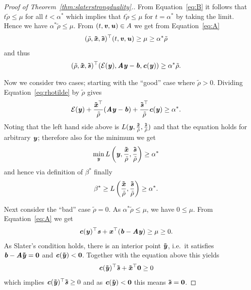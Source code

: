 {\begin{proof}[Proof of Theorem~\ref{thm:slaterstrongduality}.]
From Equation~\eqref{eq:B} it follows that $t\tilde\rho \leq \mu$ for all $t < \alpha^*$ which implies that $t\tilde\rho \leq \mu$ for $t = \alpha^*$ by taking the limit. Hence we have $\alpha^*\tilde\rho \leq \mu$.
From $(t, \vv, \uu) \in A$ we get from  Equation~\eqref{eq:A}
\begin{equation*}
(\tilde\rho, \xxtil, \sstil)^{\trp}(t, \vv, \uu) \geq \mu \geq \alpha^*\tilde\rho
\end{equation*}
and thus
\begin{equation}\label{eq:rhotilde}
(\tilde\rho, \xxtil, \sstil)^{\trp}(\energy(\yy), \AA\yy-\bb,\cc(\yy)) \geq \alpha^*\tilde\rho.
\end{equation}


Now we consider two cases; starting with the ``good'' case where $\tilde\rho > 0$.
Dividing  Equation~\eqref{eq:rhotilde} by $\tilde\rho$ gives
\begin{equation*}
  \energy(\yy) + \frac{\xxtil^{\trp}}{\tilde\rho}(\AA\yy - \bb) + \frac{\sstil^{\trp}}{\tilde\rho}\cc(\yy) \geq \alpha^*.
\end{equation*}
Noting that the left hand side above is $L(\yy, \frac{\xxtil}{\tilde\rho}, \frac{\sstil}{\tilde\rho})$
and that the equation holds for arbitrary $\yy$; therefore also for the minimum we get
\begin{equation*} \min_{\yy}{L\left(\yy, \frac{\xxtil}{\tilde\rho}, \frac{\sstil}{\tilde\rho}\right)}\geq \alpha^* \end{equation*}
and hence via definition of $\beta^*$ finally
\begin{equation*} \beta^* \geq L\left(\frac{\xxtil}{\tilde\rho},\frac{\sstil}{\tilde\rho}\right) \geq \alpha^*. \end{equation*}

Next consider the ``bad'' case $\tilde\rho = 0$.
As $\alpha^*\tilde\rho \leq \mu$, we have $0 \leq \mu$.
From  Equation~\eqref{eq:A} we get
\begin{equation*}
  \cc(\yy)^{\trp}\ss + \xx^{\trp}(\bb-\AA\yy) \geq \mu \geq 0.
\end{equation*}
As Slater's condition holds, there is an interior point $\yytil$, i.e.\ it satisfies $\bb - \AA\yytil = \veczero$ and $\cc(\yytil) < \veczero$. Together with the equation above this yields
\begin{equation*} \cc(\yytil)^{\trp}\sstil + \xxtil^{\trp}\veczero \geq 0 \end{equation*}
which implies
$\cc(\yytil)^{\trp}\sstil \geq 0 $
and as $\cc(\yytil) < \veczero$ this means $\sstil = \veczero$.


\end{proof}}
